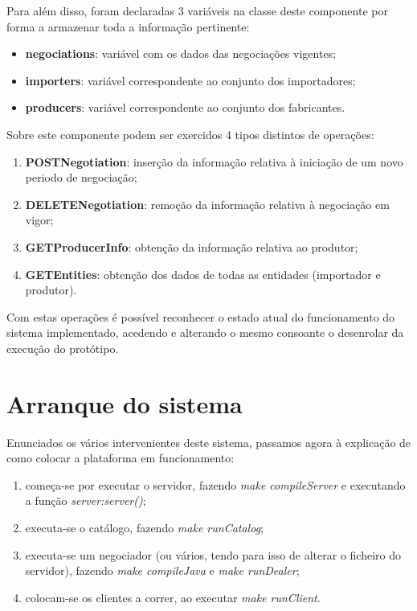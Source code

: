 \documentclass[a4paper]{report}
\begin{document}
	Para além disso, foram declaradas 3 variáveis na classe deste componente por forma a armazenar toda a informação pertinente:
	\begin{itemize}
		\item \textbf{negociations}: variável com os dados das negociações vigentes;
		\item \textbf{importers}: variável correspondente ao conjunto dos importadores;
		\item \textbf{producers}: variável correspondente ao conjunto dos fabricantes.
	\end{itemize}
	Sobre este componente podem ser exercidos 4 tipos distintos de operações:
	\begin{enumerate}
		\item \textbf{POSTNegotiation}: inserção da informação relativa à iniciação de um novo periodo de negociação;
		\item \textbf{DELETENegotiation}: remoção da informação relativa à negociação em vigor;
		\item \textbf{GETProducerInfo}: obtenção da informação relativa ao produtor;
		\item \textbf{GETEntities}: obtenção dos dados de todas as entidades (importador e produtor).
	\end{enumerate}
	Com estas operações é possível reconhecer o estado atual do funcionamento do sistema implementado, acedendo e alterando o mesmo consoante o desenrolar da execução do protótipo.

	\section{Arranque do sistema}
	Enunciados os vários intervenientes deste sistema, passamos agora à explicação de como colocar a plataforma em funcionamento:

	\begin{enumerate}
		\item começa-se por executar o servidor, fazendo \textit{make compileServer} e executando a função \textit{server:server()};
		
		\item executa-se o catálogo, fazendo \textit{make runCatalog};
	
		\item executa-se um negociador (ou vários, tendo para isso de alterar o ficheiro do servidor), fazendo \textit{make compileJava} e \textit{make runDealer};
	
		\item colocam-se os clientes a correr, ao executar \textit{make runClient}.
	\end{enumerate}
\end{document}
